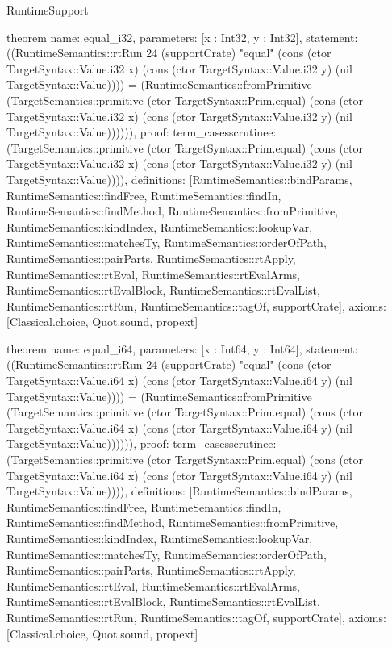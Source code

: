 \begin{lexlean}{RuntimeSupport}
\begin{semanticmodule}
theorem{
  name: equal_i32,
  parameters: [x : Int32, y : Int32],
  statement: ((RuntimeSemantics::rtRun 24 (supportCrate) "equal" (cons (ctor TargetSyntax::Value.i32 x) (cons (ctor TargetSyntax::Value.i32 y) (nil TargetSyntax::Value)))) = (RuntimeSemantics::fromPrimitive (TargetSemantics::primitive (ctor TargetSyntax::Prim.equal) (cons (ctor TargetSyntax::Value.i32 x) (cons (ctor TargetSyntax::Value.i32 y) (nil TargetSyntax::Value)))))),
  proof: term_cases{scrutinee: (TargetSemantics::primitive (ctor TargetSyntax::Prim.equal) (cons (ctor TargetSyntax::Value.i32 x) (cons (ctor TargetSyntax::Value.i32 y) (nil TargetSyntax::Value)))), definitions: [RuntimeSemantics::bindParams, RuntimeSemantics::findFree, RuntimeSemantics::findIn, RuntimeSemantics::findMethod, RuntimeSemantics::fromPrimitive, RuntimeSemantics::kindIndex, RuntimeSemantics::lookupVar, RuntimeSemantics::matchesTy, RuntimeSemantics::orderOfPath, RuntimeSemantics::pairParts, RuntimeSemantics::rtApply, RuntimeSemantics::rtEval, RuntimeSemantics::rtEvalArms, RuntimeSemantics::rtEvalBlock, RuntimeSemantics::rtEvalList, RuntimeSemantics::rtRun, RuntimeSemantics::tagOf, supportCrate]},
  axioms: [Classical.choice, Quot.sound, propext]
}

theorem{
  name: equal_i64,
  parameters: [x : Int64, y : Int64],
  statement: ((RuntimeSemantics::rtRun 24 (supportCrate) "equal" (cons (ctor TargetSyntax::Value.i64 x) (cons (ctor TargetSyntax::Value.i64 y) (nil TargetSyntax::Value)))) = (RuntimeSemantics::fromPrimitive (TargetSemantics::primitive (ctor TargetSyntax::Prim.equal) (cons (ctor TargetSyntax::Value.i64 x) (cons (ctor TargetSyntax::Value.i64 y) (nil TargetSyntax::Value)))))),
  proof: term_cases{scrutinee: (TargetSemantics::primitive (ctor TargetSyntax::Prim.equal) (cons (ctor TargetSyntax::Value.i64 x) (cons (ctor TargetSyntax::Value.i64 y) (nil TargetSyntax::Value)))), definitions: [RuntimeSemantics::bindParams, RuntimeSemantics::findFree, RuntimeSemantics::findIn, RuntimeSemantics::findMethod, RuntimeSemantics::fromPrimitive, RuntimeSemantics::kindIndex, RuntimeSemantics::lookupVar, RuntimeSemantics::matchesTy, RuntimeSemantics::orderOfPath, RuntimeSemantics::pairParts, RuntimeSemantics::rtApply, RuntimeSemantics::rtEval, RuntimeSemantics::rtEvalArms, RuntimeSemantics::rtEvalBlock, RuntimeSemantics::rtEvalList, RuntimeSemantics::rtRun, RuntimeSemantics::tagOf, supportCrate]},
  axioms: [Classical.choice, Quot.sound, propext]
}


\end{semanticmodule}
\end{lexlean}
